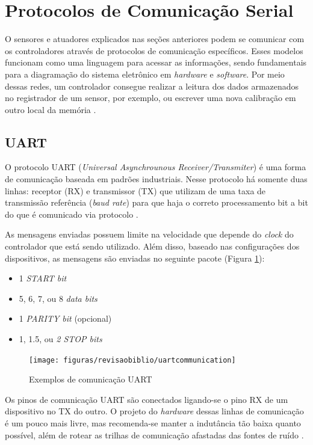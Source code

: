 \section{Protocolos de Comunicação Serial}

O sensores e atuadores explicados nas seções anteriores podem se comunicar com os controladores através de protocolos de comunicação específicos. Esses modelos funcionam como uma linguagem para acessar as informações, sendo fundamentais para a diagramação do sistema eletrônico em \textit{hardware} e \textit{software}. Por meio dessas redes, um controlador consegue realizar a leitura dos dados armazenados no registrador de um sensor, por exemplo, ou escrever uma nova calibração em outro local da memória \cite{man:texasI2C}.

\subsection{UART}
O protocolo UART (\textit{Universal Asynchrounous Receiver/Transmiter}) é uma forma de comunicação baseada em padrões industriais. Nesse protocolo há somente duas linhas: receptor (RX) e transmissor (TX) que utilizam de uma taxa de transmissão referência (\textit{baud rate}) para que haja o correto processamento bit a bit do que é comunicado via protocolo \cite{man:texasUART}. 

As mensagens enviadas possuem limite na velocidade que depende do \textit{clock} do controlador que está sendo utilizado. Além disso, baseado nas configurações dos dispositivos, as mensagens são enviadas no seguinte pacote (Figura \ref{fig:uartcommunication}):

\begin{itemize}
	\item 1 \textit{START bit}
	\item 5, 6, 7, ou  8 \textit{data bits}
	\item 1 \textit{PARITY bit} (opcional)
	\item 1, 1.5, ou \textit{2 STOP bits}
\end{itemize}

\begin{figure}[!htb]
	\centering
	\caption{Exemplos de comunicação UART}
	\texttt{[image: figuras/revisaobiblio/uartcommunication]}
	\label{fig:uartcommunication}
\end{figure}

Os pinos de comunicação UART são conectados ligando-se o pino RX de um dispositivo no TX do outro. O projeto do \textit{hardware} dessas linhas de comunicação é um pouco mais livre, mas recomenda-se manter a indutância tão baixa quanto possível, além de rotear as trilhas de comunicação afastadas das fontes de ruído \cite{site:altiumpcb}.

